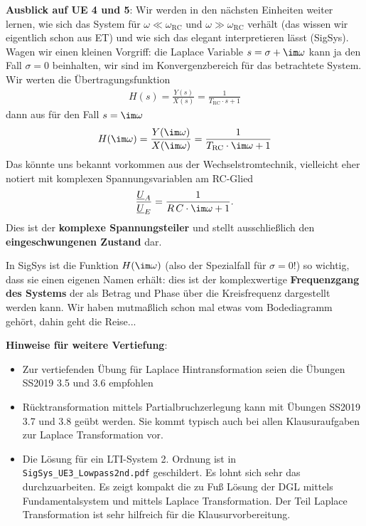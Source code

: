 \clearpage
\begin{mdframed}
\textbf{Ausblick auf UE 4 und 5}:
Wir werden in den nächsten Einheiten weiter lernen, wie sich das System
für $\omega\ll\omega_\mathrm{RC}$ und $\omega\gg\omega_\mathrm{RC}$
verhält (das wissen wir eigentlich schon aus ET) und wie sich das elegant
interpretieren lässt (SigSys).
Wagen wir einen kleinen Vorgriff: die Laplace Variable $s=\sigma + \im\omega$
kann ja den Fall $\sigma=0$ beinhalten, wir sind im Konvergenzbereich
für das betrachtete System. Wir werten die Übertragungsfunktion
\begin{align}
H(s) = \frac{Y(s)}{X(s)} = \frac{1}{T_\mathrm{RC} \cdot s + 1}
\end{align}
dann aus für den Fall $s=\im\omega$
\begin{align}
H(\im\omega) = \frac{Y(\im\omega)}{X(\im\omega)} =
\frac{1}{T_\mathrm{RC} \cdot \im\omega + 1}
\end{align}
Das könnte uns bekannt vorkommen aus der Wechselstromtechnik, vielleicht eher
notiert mit komplexen Spannungsvariablen am RC-Glied
\begin{align}
\frac{\underline{U}_A}{\underline{U}_E} =
\frac{1}{R\,C \cdot \im\omega + 1}.
\end{align}
Dies ist der \textbf{komplexe Spannungsteiler} und stellt
ausschließlich den \textbf{eingeschwungenen Zustand} dar.

In SigSys ist die Funktion $H(\im\omega)$ (also der Spezialfall
für $\sigma=0$!) so wichtig, dass sie einen eigenen Namen erhält: dies ist
der komplexwertige \textbf{Frequenzgang des Systems} der als Betrag und Phase
über die Kreisfrequenz dargestellt werden kann.
Wir haben mutmaßlich schon mal etwas vom Bodediagramm gehört, dahin geht die Reise...

\end{mdframed}

\textbf{Hinweise für weitere Vertiefung}:
\begin{itemize}
  \item Zur vertiefenden Übung für Laplace Hintransformation seien die Übungen SS2019 3.5 und 3.6 empfohlen
  \item Rücktransformation mittels Partialbruchzerlegung kann mit Übungen SS2019 3.7 und 3.8 geübt werden.
  Sie kommt typisch auch bei allen Klausuraufgaben zur Laplace Transformation vor.
  \item Die Lösung für ein LTI-System 2. Ordnung ist in
  \verb|SigSys_UE3_Lowpass2nd.pdf| geschildert. Es lohnt sich sehr das durchzuarbeiten.
 Es zeigt kompakt die zu Fuß Lösung der DGL mittels Fundamentalsystem und mittels Laplace Transformation.
 Der Teil Laplace Transformation ist sehr hilfreich für die Klausurvorbereitung.
\end{itemize}
